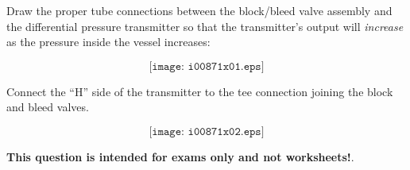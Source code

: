 

Draw the proper tube connections between the block/bleed valve assembly and the differential pressure transmitter so that the transmitter's output will {\it increase} as the pressure inside the vessel increases:

$$\texttt{[image: i00871x01.eps]}$$







Connect the ``H'' side of the transmitter to the tee connection joining the block and bleed valves.

$$\texttt{[image: i00871x02.eps]}$$







{\bf This question is intended for exams only and not worksheets!}.



